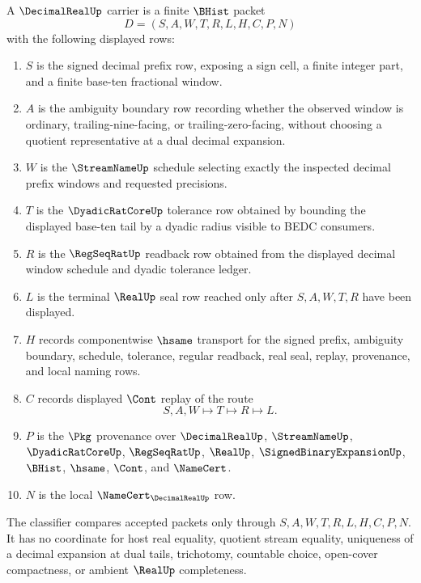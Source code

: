 \begin{definition}
\label{def:decimal-real-carrier}
A $\DecimalRealUp$ carrier is a finite $\BHist$ packet
$$
D=(S,A,W,T,R,L,H,C,P,N)
$$
with the following displayed rows:
\begin{enumerate}
\item $S$ is the signed decimal prefix row, exposing a sign cell, a finite integer part, and a finite base-ten fractional window.
\item $A$ is the ambiguity boundary row recording whether the observed window is ordinary, trailing-nine-facing, or trailing-zero-facing, without choosing a quotient representative at a dual decimal expansion.
\item $W$ is the $\StreamNameUp$ schedule selecting exactly the inspected decimal prefix windows and requested precisions.
\item $T$ is the $\DyadicRatCoreUp$ tolerance row obtained by bounding the displayed base-ten tail by a dyadic radius visible to BEDC consumers.
\item $R$ is the $\RegSeqRatUp$ readback row obtained from the displayed decimal window schedule and dyadic tolerance ledger.
\item $L$ is the terminal $\RealUp$ seal row reached only after $S,A,W,T,R$ have been displayed.
\item $H$ records componentwise $\hsame$ transport for the signed prefix, ambiguity boundary, schedule, tolerance, regular readback, real seal, replay, provenance, and local naming rows.
\item $C$ records displayed $\Cont$ replay of the route
$$
S,A,W \longmapsto T \longmapsto R \longmapsto L .
$$
\item $P$ is the $\Pkg$ provenance over $\DecimalRealUp$, $\StreamNameUp$, $\DyadicRatCoreUp$, $\RegSeqRatUp$, $\RealUp$, $\SignedBinaryExpansionUp$, $\BHist$, $\hsame$, $\Cont$, and $\NameCert$.
\item $N$ is the local $\NameCert_{\DecimalRealUp}$ row.
\end{enumerate}
The classifier compares accepted packets only through $S,A,W,T,R,L,H,C,P,N$. It has no coordinate for host real equality, quotient stream equality, uniqueness of a decimal expansion at dual tails, trichotomy, countable choice, open-cover compactness, or ambient $\RealUp$ completeness.
\end{definition}

